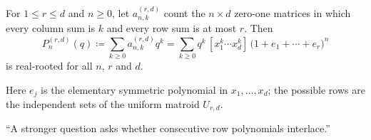 \providecommand{\elementaryE}{e}

\begin{conjecture}
\label{conjBalancedArrays}
For $1\leq r\leq d$ and $n\geq0$, let $a^{(r,d)}_{n,k}$ count the
$n\times d$ zero-one matrices in which every column sum is $k$ and every row
sum is at most $r$.  Then
\[
  P^{(r,d)}_n(q)\coloneqq\sum_{k\geq0}a^{(r,d)}_{n,k}q^k
  =\sum_{k\geq0}q^k\,[x_1^k\dotsm x_d^k]\,
  \bigl(1+\elementaryE_1+\dotsb+\elementaryE_r\bigr)^n
\]
is real-rooted for all $n$, $r$ and $d$.
\end{conjecture}

Here $\elementaryE_j$ is the elementary symmetric polynomial in
$x_1,\dotsc,x_d$; the possible rows are the independent sets of the uniform
matroid $U_{r,d}$.

\par\noindent “A stronger question asks whether consecutive row polynomials interlace.”
